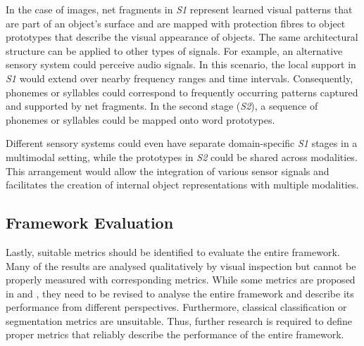 In the case of images, net fragments in \emph{S1} represent learned visual patterns that are part of an object's surface and are mapped with protection fibres to object prototypes that describe the visual appearance of objects. 
The same architectural structure can be applied to other types of signals. For example, an alternative sensory system could perceive audio signals. In this scenario, the local support in \emph{S1} would extend over nearby frequency ranges and time intervals. Consequently, phonemes or syllables could correspond to frequently occurring patterns captured and supported by net fragments. In the second stage (\emph{S2}), a sequence of phonemes or syllables could be mapped onto word prototypes.

Different sensory systems could even have separate domain-specific \emph{S1} stages in a multimodal setting, while the prototypes in \emph{S2} could be shared across modalities. This arrangement would allow the integration of various sensor signals and facilitates the creation of internal object representations with multiple modalities.


\subsection{Framework Evaluation}
Lastly, suitable metrics should be identified to evaluate the entire framework. Many of the results are analysed qualitatively by visual inspection but cannot be properly measured with corresponding metrics.
While some metrics are proposed in  and , they need to be revised to analyse the entire framework and describe its performance from different perspectives.
Furthermore, classical classification or segmentation metrics are unsuitable.
Thus, further research is required to define proper metrics that reliably describe the performance of the entire framework.






